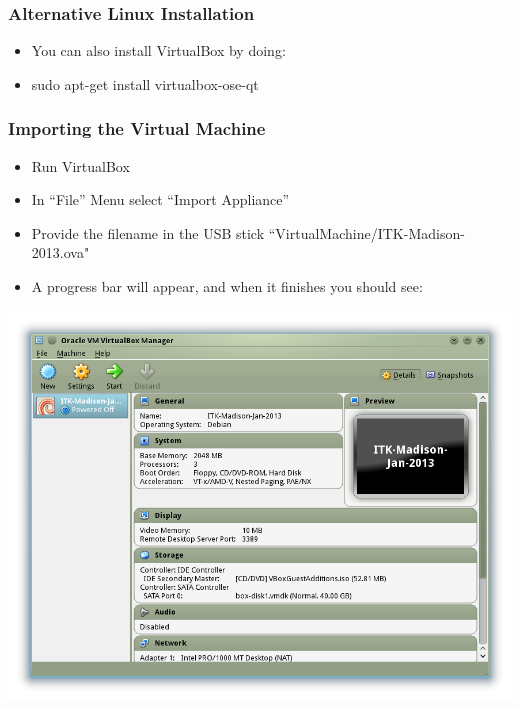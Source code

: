 \begin{frame}
\frametitle{Alternative Linux Installation}
\begin{itemize}
\item  You can also install VirtualBox by doing:
\item  sudo apt-get install virtualbox-ose-qt
\end{itemize}
\end{frame}

\begin{frame}
\frametitle{Importing the Virtual Machine}
\begin{itemize}
\item Run VirtualBox
\item In ``File'' Menu select ``Import Appliance''
\item Provide the filename in the USB stick ``VirtualMachine/ITK-Madison-2013.ova"
\item A progress bar will appear, and when it finishes you should see:
\end{itemize}
\begin{center}
  \includegraphics[width=0.5\paperwidth]{../Art/Screenshot-VirtualBox-OSE-01.png}
\end{center}
\end{frame}
